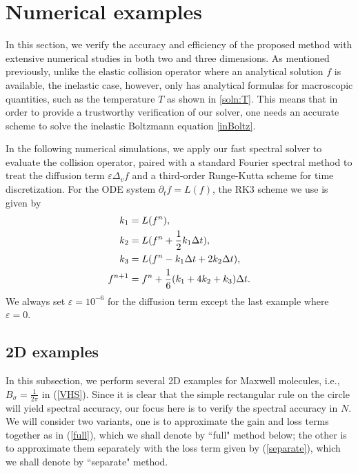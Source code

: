 \documentclass[review, times]{elsarticle}
\begin{document}
\section{Numerical examples}

In this section, we verify the accuracy and efficiency of the proposed method with extensive numerical studies in both two and three dimensions. As mentioned previously, unlike the elastic collision operator where an analytical solution $f$ is available, the inelastic case, however, only has analytical formulas for macroscopic quantities, such as the temperature $T$ as shown in \eqref{soln:T}. This means that in order to provide a trustworthy verification of our solver, one needs an accurate scheme to solve the inelastic Boltzmann equation \eqref{inBoltz}.

In the following numerical simulations, we apply our fast spectral solver to evaluate the collision operator, paired with a standard Fourier spectral method to treat the diffusion term $\varepsilon\Delta_v f$ and a third-order Runge-Kutta scheme for time discretization. For the ODE system $\partial_t f=L(f)$, the RK3 scheme we use is given by
\begin{align}
  k_1 &= L(f^n), \notag \\
  k_2 &= L(f^n + \frac{1}{2}k_1\Delta t), \notag \\
  k_3 &= L(f^n - k_1\Delta t + 2k_2\Delta t), \notag \\
  f^{n+1} &= f^n + \frac{1}{6}(k_1 + 4k_2 + k_3)\Delta t.
\end{align}
We always set $\varepsilon=10^{-6}$ for the diffusion term except the last example where $\varepsilon=0$.

\subsection{2D examples}

In this subsection, we perform several 2D examples for Maxwell molecules, i.e., $B_{\sigma}=\frac{1}{2\pi}$ in (\ref{VHS}). Since it is clear that the simple rectangular rule on the circle will yield spectral accuracy, our focus here is to verify the spectral accuracy in $N$. We will consider two variants, one is to approximate the gain and loss terms together as in (\ref{full}), which we shall denote by ``full" method below; the other is to approximate them separately with the loss term given by (\ref{separate}), which we shall denote by ``separate" method.
\end{document}
